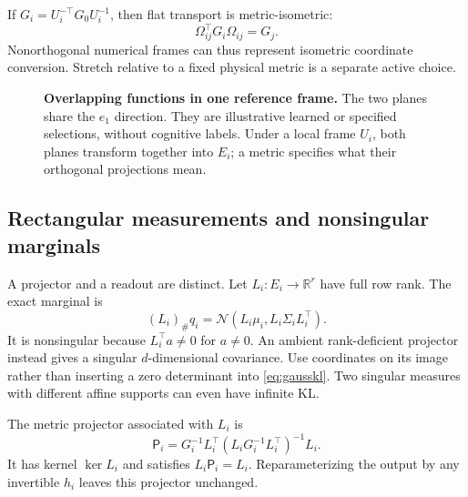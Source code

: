 \documentclass[11pt,letterpaper]{article}
\newcommand{\R}{\mathbb R}
\theoremstyle{remark}
\begin{document}
If $G_i=U_i^{-\top}G_0U_i^{-1}$, then flat transport is metric-isometric:
\begin{equation}
 \Omega_{ij}^\top G_i\Omega_{ij}=G_j.
\end{equation}
Nonorthogonal numerical frames can thus represent isometric coordinate conversion. Stretch relative to a fixed physical metric is a separate active choice.

\begin{figure}[tb]
\centering
{}
\caption{\textbf{Overlapping functions in one reference frame.} The two planes share the $e_1$ direction. They are illustrative learned or specified selections, without cognitive labels. Under a local frame $U_i$, both planes transform together into $E_i$; a metric specifies what their orthogonal projections mean.}
\label{fig:planes}
\end{figure}

\subsection{Rectangular measurements and nonsingular marginals}
A projector and a readout are distinct. Let $L_i:E_i\to\R^r$ have full row rank. The exact marginal is
\begin{equation}
 (L_i)_\#q_i=\mathcal N(L_i\mu_i,L_i\Sigma_iL_i^\top).
\end{equation}
It is nonsingular because $L_i^\top a\ne0$ for $a\ne0$. An ambient rank-deficient projector instead gives a singular $d$-dimensional covariance. Use coordinates on its image rather than inserting a zero determinant into \eqref{eq:gausskl}. Two singular measures with different affine supports can even have infinite KL.

The metric projector associated with $L_i$ is
\begin{equation}
 \mathsf P_i=G_i^{-1}L_i^\top(L_iG_i^{-1}L_i^\top)^{-1}L_i.
\end{equation}
It has kernel $\ker L_i$ and satisfies $L_i\mathsf P_i=L_i$. Reparameterizing the output by any invertible $h_i$ leaves this projector unchanged.
\end{document}
